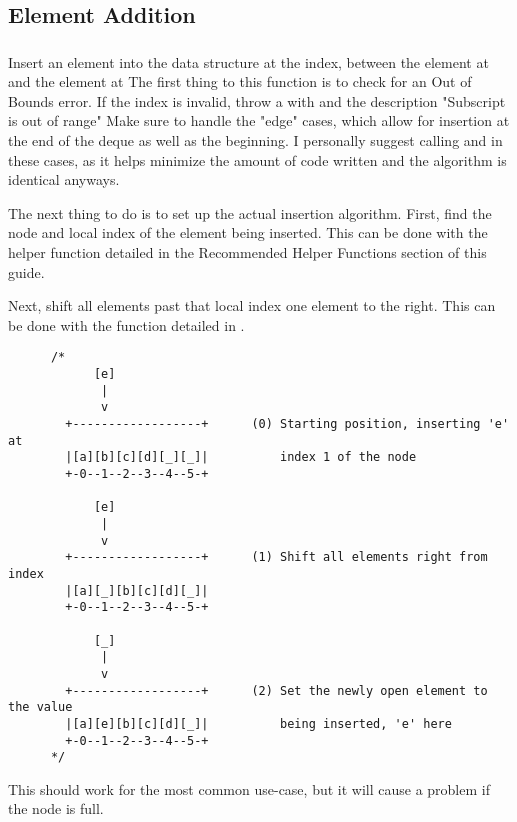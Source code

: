 \subsection{Element Addition}


\subsubsection{}
\label{func:insert}

Insert an element into the data structure at the index, between the element
at \cpp{[index - 1]} and the element at \cpp{[index]}
The first thing to this function is to check for an Out of Bounds error. If
the index is invalid, throw a  with  and the
description "Subscript is out of range"
Make sure to handle the "edge" cases, which allow for insertion at the end
of the deque as well as the beginning. I personally suggest calling
 and  in these cases, as it helps minimize the amount
of code written and the algorithm is identical anyways.

\indent The next thing to do is to set up the actual insertion algorithm.
First, find the node and local index of the element being inserted. This
can be done with the  helper function detailed in the
Recommended Helper Functions section of this guide.

Next, shift all elements past that local index one element to the right.
This can be done with the  function detailed in .

\begin{verbatim}
      /*
            [e]
             |
             v
        +------------------+      (0) Starting position, inserting 'e' at
        |[a][b][c][d][_][_]|          index 1 of the node
        +-0--1--2--3--4--5-+

            [e]
             |
             v
        +------------------+      (1) Shift all elements right from index
        |[a][_][b][c][d][_]|
        +-0--1--2--3--4--5-+

            [_]
             |
             v
        +------------------+      (2) Set the newly open element to the value
        |[a][e][b][c][d][_]|          being inserted, 'e' here
        +-0--1--2--3--4--5-+
      */
\end{verbatim}


\indent This should work for the most common use-case, but it will cause a
problem if the node is full.

